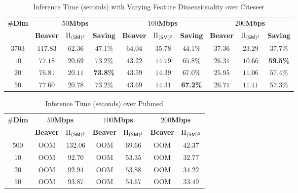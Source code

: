 \begin{table*}[!t]
 	\centering
 	\caption{Inference Time (seconds) with Varying Feature Dimensionality over Citeseer}
 	\label{table:time_fea_dim_infer_cite}
 \setlength\tabcolsep{8pt}
 	 	\begin{tabular}{c|c|c|c|c|c|c|c|c|c}
 	 	\hline
 \multirow{2}{*}{\textbf{$\#$Dim}} &\multicolumn{3}{c|}{\textbf{$50$Mbps}} &\multicolumn{3}{c|}{\textbf{$100$Mbps}} &\multicolumn{3}{c}{\textbf{$200$Mbps}}
 \\\cline{2-10}
 	 & \textbf{Beaver} & ${\Pi_{\mathsf{(SM)^2}}}$ & \textbf{Saving} & \textbf{Beaver} & ${\Pi_{\mathsf{(SM)^2}}}$ 	 & \textbf{Saving} & \textbf{Beaver} & ${\Pi_{\mathsf{(SM)^2}}}$ & \textbf{Saving}
 	\\\hline
 	$3703$ &$117.83$ &$62.36$ &$47.1\%$ &$64.04$ &$35.78$ &$44.1\%$ &$37.36$ & $23.29$ & $37.7\%$\\
	$10$ &$77.18$ &$20.69$ &$73.2\%$ &$43.22$ &$14.79$ &$65.8\%$ &$26.31$ & $10.66$ & \textbf{59.5\%}\\
 	$20$ &$76.81$ &$20.11$ &\textbf{73.8\%} &$43.59$ &$14.39$ &$67.0\%$ &$25.95$ & $11.06$ & $57.4\%$\\
 	 $50$ &$77.60$ &$20.78$ &$73.2\%$ &$43.69$ &$ 14.31$ &\textbf{67.2\%} &$26.71$ & $11.41$ & $57.3\%$\\\hline
 	 \end{tabular}
\end{table*}

 \begin{table}[!t]
 	\centering
 	\caption{Inference Time (seconds)
  over Pubmed}
 	\label{table:time_fea_dim_infer_pubmed}
 \setlength\tabcolsep{2pt}
 	 	\begin{tabular}{c|c|c|c|c|c|c}
 	 	\hline
 \multirow{2}{*}{\textbf{$\#$Dim}} &\multicolumn{2}{c|}{\textbf{$50$Mbps}} &\multicolumn{2}{c|}{\textbf{$100$Mbps}}&\multicolumn{2}{c}{\textbf{$200$Mbps}}
 \\\cline{2-7}
 	& \textbf{Beaver} & ${\Pi_{\mathsf{(SM)^2}}}$ & \textbf{Beaver} & ${\Pi_{\mathsf{(SM)^2}}}$ 	& \textbf{Beaver} & ${\Pi_{\mathsf{(SM)^2}}}$ \\
 	 	\hline
 	 	 $500$&OOM&$132.06$ &OOM&$69.66$&OOM& $42.37$\\
 	 $10$&OOM&$92.70$&OOM &$53.35$&OOM& $32.77$\\
 	 $20$&OOM&$92.94$&OOM &$53.88$&OOM& $34.22$\\
 	 $50$&OOM&$93.87$&OOM &$54.67$&OOM& $33.49$\\\hline
 	 \end{tabular}
\end{table}



